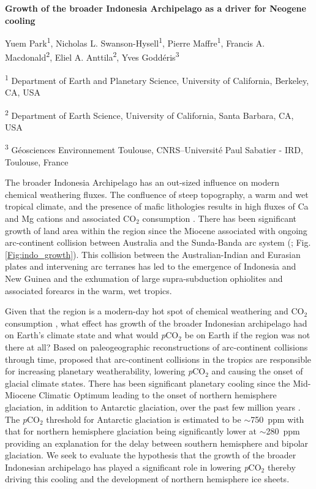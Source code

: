 \documentclass[11pt,letterpaper]{article}
\newcommand{\pCOtwo}{\textit{p}CO$_{2}$\xspace}
\newcommand{\COtwo}{CO$_{2}$\xspace}
\begin{document}
\begin{flushleft}
{\Large \textbf{Growth of the broader Indonesia Archipelago as a driver for Neogene cooling}}

Yuem Park\textsuperscript{1},
Nicholas L. Swanson-Hysell\textsuperscript{1},
Pierre Maffre\textsuperscript{1},
Francis A. Macdonald\textsuperscript{2},
Eliel A. Anttila\textsuperscript{2},
Yves Godd\'eris\textsuperscript{3}

\bigskip
\textsuperscript{1} Department of Earth and Planetary Science, University of California, Berkeley, CA, USA

\textsuperscript{2} Department of Earth Science, University of California, Santa Barbara, CA, USA

\textsuperscript{3} G\'eosciences Environnement Toulouse, CNRS--Universit\'e Paul Sabatier - IRD, Toulouse, France

\bigskip

\end{flushleft}

\linenumbers

The broader Indonesia Archipelago has an out-sized influence on modern chemical weathering fluxes. The confluence of steep topography, a warm and wet tropical climate, and the presence of mafic lithologies results in high fluxes of Ca and Mg cations and associated \COtwo consumption \citep{Hartmann2009a, Hartmann2014a}. There has been significant growth of land area within the region since the Miocene associated with ongoing arc-continent collision between Australia and the Sunda-Banda arc system (\citealp{Molnar2015a}; Fig. \ref{Fig:indo_growth}). This collision between the Australian-Indian and Eurasian plates and intervening arc terranes has led to the emergence of Indonesia and New Guinea and the exhumation of large supra-subduction ophiolites and associated forearcs in the warm, wet tropics.

Given that the region is a modern-day hot spot of chemical weathering and \COtwo consumption \citep{Hartmann2009a}, what effect has growth of the broader Indonesian archipelago had on Earth's climate state and what would \pCOtwo be on Earth if the region was not there at all? Based on paleogeographic reconstructions of arc-continent collisions through time, \citet{Macdonald2019a} proposed that arc-continent collisions in the tropics are responsible for increasing planetary weatherability, lowering \pCOtwo and causing the onset of glacial climate states. There has been significant planetary cooling since the Mid-Miocene Climatic Optimum leading to the onset of northern hemisphere glaciation, in addition to Antarctic glaciation, over the past few million years \citep{Shackleton1984a}. The \pCOtwo threshold for Antarctic glaciation is estimated to be $\sim$750~ppm with that for northern hemisphere glaciation being significantly lower at $\sim$280~ppm \citep{DeConto2008a} providing an explanation for the delay between southern hemisphere and bipolar glaciation. We seek to evaluate the hypothesis that the growth of the broader Indonesian archipelago has played a significant role in lowering \pCOtwo thereby driving this cooling and the development of northern hemisphere ice sheets.
\end{document}
